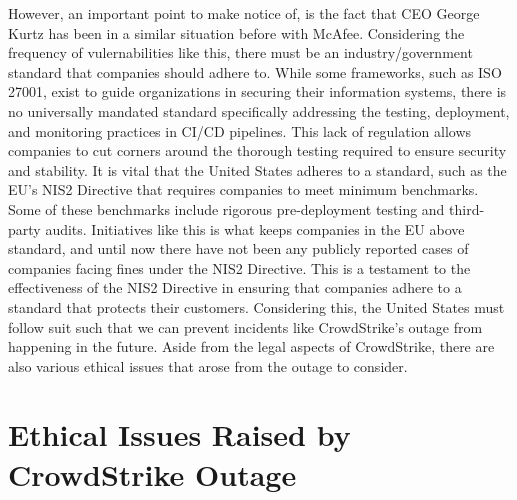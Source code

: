 However, an important point to make notice of, is the fact that CEO George Kurtz has been in a similar situation before with McAfee. Considering the frequency of
vulernabilities like this, there must be an industry/government standard that companies should adhere to.  While some frameworks, such as ISO 27001, exist to guide organizations in securing their information systems,
there is no universally mandated standard specifically addressing the testing, deployment, and monitoring practices in CI/CD pipelines. This lack of regulation allows companies to cut corners around the thorough testing required to ensure security and stability.
It is vital that the United States adheres to a standard, such as the EU's NIS2 Directive that requires companies to meet minimum benchmarks.
Some of these benchmarks include rigorous pre-deployment testing and third-party audits. \cite{eu_nis2} Initiatives like this is what keeps companies in the EU above standard,
and until now there have not been any publicly reported cases of companies facing fines under the NIS2 Directive. This is a testament to the effectiveness of the NIS2 Directive in ensuring that companies adhere to a standard that protects their customers.
Considering this, the United States must follow suit such that we can prevent incidents like CrowdStrike's outage from happening in the future. Aside from the legal aspects of CrowdStrike, there are also various ethical issues that arose from the outage to consider. 

\section{Ethical Issues Raised by CrowdStrike Outage}
